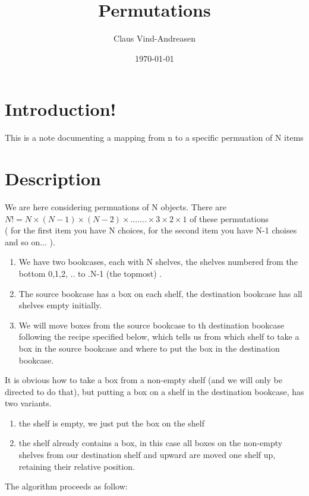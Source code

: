 \documentclass{article} %
\title{Permutations} %
\author{Claus Vind-Andreasen} %
\date{\today} %
\begin{document}
    \maketitle %
    
    \section{Introduction!} %
    
    \text
 This is a note documenting a mapping from n to a specific permuation of N items

  \section{Description  } %
    
We are here considering permuations of N objects. There are \(  N!  = N \times (N-1) \times (N-2) \times.......\times 3 \times 2 \times 1 \)  of these permutations 
\\
 ( for the first item you have N choices, for  the second item you have  N-1 choises and so on... ).
\\
\begin{enumerate}
\item
We have two bookcases, each with N shelves, the shelves  numbered from the bottom 0,1,2, .. to .N-1 (the topmost) .  
\item
The source bookcase has a box on each shelf, the destination bookcase has all shelves empty initially.  
\item
We will move boxes from the source bookcase to th destination bookcase following  the recipe  specified below, which tells us from  which shelf to take a box  in the source bookcase and where to put the box in the destination bookcase. 
\end{enumerate}
\noindent

It is obvious how to take a box from a non-empty shelf (and we will only be directed to do that), but putting a box on a shelf in the destination bookcase, has two variants.
\begin{enumerate}
\item 
the shelf is empty, we just put the box on the shelf
\item 
the shelf already contains a box, in this case all boxes on the  non-empty shelves from our destination shelf and upward  are  moved one shelf up, retaining their relative position.
\end{enumerate}
\newpage
\noindent 
The algorithm proceeds as follow:
 
\end{document}
